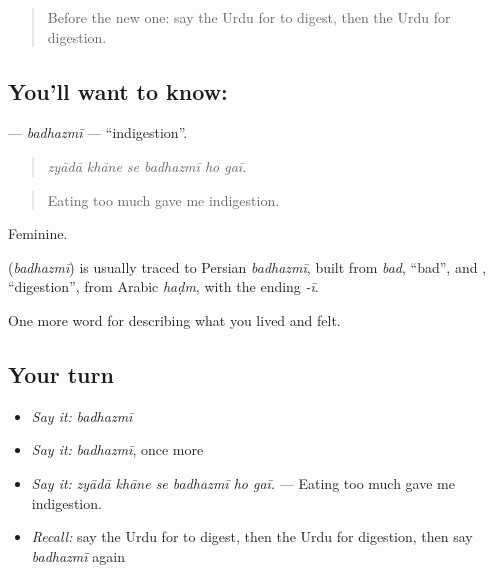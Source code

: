 \begin{quote}
Before the new one: say the Urdu for to digest, then the Urdu for digestion.
\end{quote}

\subsection*{You'll want to know: }
\textbf{} — \emph{badhazmī} — \textquotedblleft{}indigestion\textquotedblright{}.

\begin{quote}
     
\end{quote}

\begin{quote}
\emph{zyādā khāne se badhazmī ho gaī.}
\end{quote}

\begin{quote}
Eating too much gave me indigestion.
\end{quote}

Feminine.

\begin{cousinweb}
\textbf{} (\emph{badhazmī}) is usually traced to Persian \emph{badhazmī}, built from \emph{bad}, \textquotedblleft{}bad\textquotedblright{}, and \textbf{}, \textquotedblleft{}digestion\textquotedblright{}, from Arabic \emph{haḍm}, with the ending \emph{-ī}.
\end{cousinweb}

\begin{grammarlens}[title={What you've built}]
One more word for describing what you lived and felt.
\end{grammarlens}

\subsection*{Your turn}
\begin{itemize}
\raggedright
  \item \emph{Say it:} \emph{badhazmī}
  \item \emph{Say it:} \emph{badhazmī}, once more
  \item \emph{Say it:} \emph{zyādā khāne se badhazmī ho gaī.} — Eating too much gave me indigestion.
  \item \emph{Recall:} say the Urdu for to digest, then the Urdu for digestion, then say \emph{badhazmī} again
\end{itemize}

